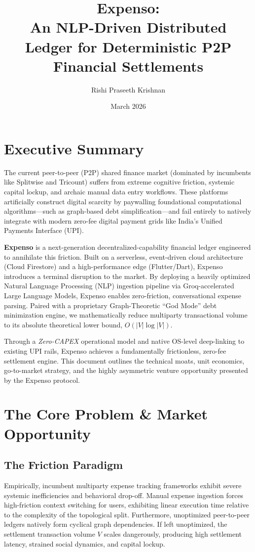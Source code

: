 \documentclass[11pt, letterpaper]{article}
\title{\textbf{Expenso:} \\ \large An NLP-Driven Distributed Ledger for Deterministic P2P Financial Settlements}
\author{Rishi Praseeth Krishnan}
\date{March 2026}
\begin{document}
\maketitle

\tableofcontents
\newpage

\section*{Executive Summary}
The current peer-to-peer (P2P) shared finance market (dominated by incumbents like Splitwise and Tricount) suffers from extreme cognitive friction, systemic capital lockup, and archaic manual data entry workflows. These platforms artificially construct digital scarcity by paywalling foundational computational algorithms—such as graph-based debt simplification—and fail entirely to natively integrate with modern zero-fee digital payment grids like India's Unified Payments Interface (UPI).

\textbf{Expenso} is a next-generation decentralized-capability financial ledger engineered to annihilate this friction. Built on a serverless, event-driven cloud architecture (Cloud Firestore) and a high-performance edge (Flutter/Dart), Expenso introduces a terminal disruption to the market. By deploying a heavily optimized Natural Language Processing (NLP) ingestion pipeline via Groq-accelerated Large Language Models, Expenso enables zero-friction, conversational expense parsing. Paired with a proprietary Graph-Theoretic ``God Mode'' debt minimization engine, we mathematically reduce multiparty transactional volume to its absolute theoretical lower bound, $O(|V| \log |V|)$. 

Through a \textit{Zero-CAPEX} operational model and native OS-level deep-linking to existing UPI rails, Expenso achieves a fundamentally frictionless, zero-fee settlement engine. This document outlines the technical moats, unit economics, go-to-market strategy, and the highly asymmetric venture opportunity presented by the Expenso protocol.

\section{The Core Problem \& Market Opportunity}
\subsection{The Friction Paradigm}
Empirically, incumbent multiparty expense tracking frameworks exhibit severe systemic inefficiencies and behavioral drop-off. Manual expense ingestion forces high-friction context switching for users, exhibiting linear execution time relative to the complexity of the topological split. 
Furthermore, unoptimized peer-to-peer ledgers natively form cyclical graph dependencies. If left unoptimized, the settlement transaction volume $V$ scales dangerously, producing high settlement latency, strained social dynamics, and capital lockup.
\end{document}
